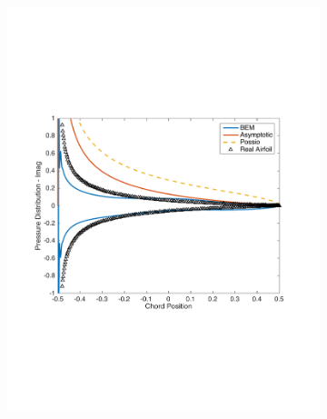 \documentclass{article}
\begin{document}
\begin{figure}[h]
\begin{subfigure}{0.3\textwidth}
	\includegraphics[width = \textwidth, height=0.2\textheight]{Pressure_k5imag}
\end{subfigure}%
\begin{subfigure}{0.33\textwidth}
	\centering

\end{subfigure}
\end{figure}
\end{document}
